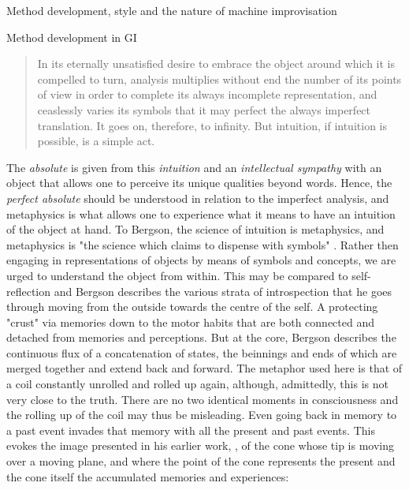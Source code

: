 \documentclass[presentation]{beamer}
\begin{document}
\begin{frame}[label={sec:org08c5441}]{Method development, style and the nature of machine improvisation}
\begin{block}{Method development in GI}
\begin{quote}
In its eternally unsatisfied desire to embrace the object around which it is compelled to turn, analysis multiplies without end the number of its points of view in order to complete its always incomplete representation, and ceaslessly varies its symbols that it may perfect the always imperfect translation. It goes on, therefore, to infinity. But intuition, if intuition is possible, is a simple act. \citep[p. 8]{Bergson1912}
\end{quote}
The \emph{absolute} is given from this \emph{intuition} and an \emph{intellectual sympathy} with an object that allows one to perceive its unique qualities beyond words. Hence, the \emph{perfect absolute} should be understood in relation to the imperfect analysis, and metaphysics is what allows one to experience what it means to have an intuition of the object at hand. To Bergson, the science of intuition is metaphysics, and metaphysics is "the science which claims to dispense with symbols" \citep[p. 9]{Bergson1912}. Rather then engaging in representations of objects by means of symbols and concepts, we are urged to understand the object from within. This may be compared to self-reflection and Bergson describes the various strata of introspection that he goes through moving from the outside towards the centre of the self. A protecting "crust" via memories down to the motor habits that are both connected and detached from memories and perceptions. But at the core, Bergson describes the continuous flux of a concatenation of states, the beinnings and ends of which are merged together and extend back and forward. The metaphor used here is that of a coil constantly unrolled and rolled up again, although, admittedly, this is not very close to the truth. There are no two identical moments in consciousness and the rolling up of the coil may thus be misleading. Even going back in memory to a past event invades that memory with all the present and past events. This evokes the image presented in his earlier work, , of the cone whose tip is moving over a moving plane, and where the point of the cone represents the present and the cone itself the accumulated memories and experiences: 


\end{block}
\end{frame}
\end{document}

